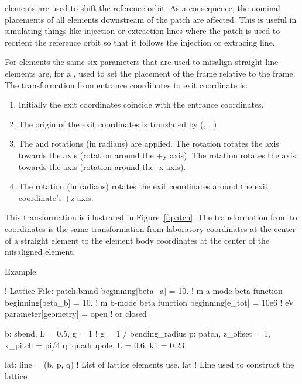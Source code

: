 \documentclass{hitec}
\begin{document}
 elements are used to shift the reference orbit. As a consequence, the nominal placements
of all elements downstream of the patch are affected. This is useful in simulating things like injection
or extraction lines where the patch is used to reorient the reference orbit so that it follows the 
injection or extracing line.

For  elements the same six parameters that are used to misalign straight line elements
are, for a , used to set the placement of the  frame relative to the 
frame. The transformation from entrance coordinates to exit coordinate is:
\vspace{-10 pt}
\begin{enumerate}
\item Initially the exit coordinates coincide with the entrance coordinates.
\item The origin of the exit coordinates is translated by (, , )
\item The  and  rotations (in radians) are applied. 
The  rotation rotates the  axis
towards the  axis (rotation around the +y axis). The  rotation rotates the  axis
towards the  axis (rotation around the -x axis).
\item The  rotation (in radians) rotates the exit coordinates around the exit coordinate's +z
axis.
\end{enumerate}
This transformation is illustrated in Figure~\ref{f:patch}. The transformation from 
 to  coordinates is the same transformation from laboratory coordinates at the
center of a straight element to the element body coordinates at the center of the misaligned
element.

\newpage

Example:
\begin{code}
! Lattice File: patch.bmad
beginning[beta_a] = 10.   ! m  a-mode beta function
beginning[beta_b] = 10.   ! m  b-mode beta function
beginning[e_tot] = 10e6   ! eV
parameter[geometry] = open  ! or closed

b: sbend, L = 0.5, g = 1    ! g = 1 / bending_radius
p: patch, z_offset = 1, x_pitch = pi/4
q: quadrupole, L = 0.6, k1 = 0.23

lat: line = (b, p, q)   ! List of lattice elements
use, lat                ! Line used to construct the lattice
\end{code}
\end{document}
